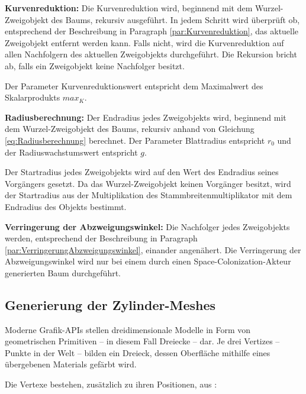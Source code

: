 \begin{description}
	\item \textbf{Kurvenreduktion:} Die Kurvenreduktion wird, beginnend mit dem Wurzel-Zweigobjekt des Baums, rekursiv ausgeführt. In jedem Schritt wird überprüft ob, entsprechend der Beschreibung in Paragraph \ref{par:Kurvenreduktion}, das aktuelle Zweigobjekt entfernt werden kann. Falls nicht, wird die Kurvenreduktion auf allen Nachfolgern des aktuellen Zweigobjekts durchgeführt. Die Rekursion bricht ab, falls ein Zweigobjekt keine Nachfolger besitzt.
	
	Der Parameter \glqq Kurvenreduktionswert\grqq{} entspricht dem Maximalwert des Skalarprodukts $max_K$.\\
	
	\item \textbf{Radiusberechnung:} Der Endradius jedes Zweigobjekts wird, beginnend mit dem Wurzel-Zweigobjekt des Baums, rekursiv anhand von Gleichung \ref{eq:Radiusberechnung} berechnet. Der Parameter \glqq Blattradius\grqq{} entspricht $r_0$ und der \glqq Radiuswachstumswert\grqq{} entspricht $g$. 
	
	Der Startradius jedes Zweigobjekts wird auf den Wert des Endradius seines Vorgängers gesetzt. Da das Wurzel-Zweigobjekt keinen Vorgänger besitzt, wird der Startradius aus der Multiplikation des Stammbreitenmultiplikator mit dem Endradius des Objekts bestimmt.\\
	
	\item \textbf{Verringerung der Abzweigungswinkel:} Die Nachfolger jedes Zweigobjekts werden, entsprechend der Beschreibung in Paragraph \ref{par:VerringerungAbzweigungswinkel}, einander angenähert. Die Verringerung der Abzweigungswinkel wird nur bei einem durch einen Space-Colonization-Akteur generierten Baum durchgeführt.
\end{description}


\subsection{Generierung der Zylinder-Meshes} \label{subsec:ZylinderMeshes}

Moderne Grafik-APIs stellen dreidimensionale Modelle in Form von geometrischen Primitiven -- in diesem Fall Dreiecke -- dar. Je drei Vertizes -- Punkte in der Welt -- bilden ein Dreieck, dessen Oberfläche mithilfe eines übergebenen Materials gefärbt wird.

Die Vertexe bestehen, zusätzlich zu ihren Positionen, aus :

